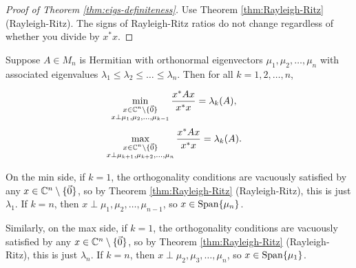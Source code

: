 \begin{proof}[Proof of Theorem \ref{thm:eigs-definiteness}]
Use Theorem \ref{thm:Rayleigh-Ritz} (Rayleigh-Ritz). The signs of Rayleigh-Ritz ratios do not change regardless of whether you divide by $x^*x$.
\end{proof}

\begin{theorem}
\label{thm:orthonormal-eigs}
Suppose $A \in M_n$ is Hermitian with orthonormal eigenvectors $\mu_1, \mu_2, \dots, \mu_n$ with associated eigenvalues $\lambda_1 \leq \lambda_2 \leq \dots \leq \lambda_n$. Then for all $k = 1, 2, \dots, n$,
\begin{multicols}{2}
\noindent \begin{align*}
    \min_{
        \substack{
            x \in \mathbb C^n \setminus \{\Vec{0}\} \\ 
            x \perp \mu_1, \mu_2, \dots, \mu_{k-1}
        }
    } \frac{x^*Ax}{x^*x} &= \lambda_k(A),
\end{align*}
\begin{align*}
    \max_{
        \substack{
            x \in \mathbb C^n \setminus \{\Vec{0}\} \\ x \perp \mu_{k+1}, \mu_{k+2}, \dots, \mu_n
        }
    } \frac{x^*Ax}{x^*x} &= \lambda_k(A).
\end{align*}
\end{multicols}
\end{theorem}
On the min side, if $k = 1$, the orthogonality conditions are vacuously satisfied by any $x \in \mathbb C^n \setminus \{\Vec{0}\}$, so by Theorem \ref{thm:Rayleigh-Ritz} (Rayleigh-Ritz), this is just $\lambda_1$. If $k = n$, then $x \perp \mu_1, \mu_2, \dots, \mu_{n-1}$, so $x \in \operatorname{Span}\{\mu_n\}$.

Similarly, on the max side, if $k = 1$, the orthogonality conditions are vacuously satisfied by any $x \in \mathbb C^n \setminus \{\Vec{0}\}$, so by Theorem \ref{thm:Rayleigh-Ritz} (Rayleigh-Ritz), this is just $\lambda_n$. If $k = n$, then $x \perp \mu_2, \mu_3, \dots, \mu_{n}$, so $x \in \operatorname{Span}\{\mu_1\}$.

